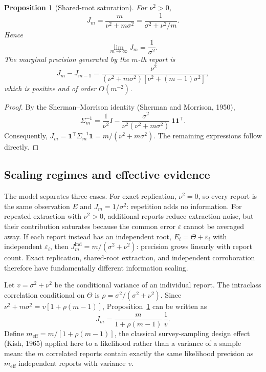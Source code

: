 \documentclass[11pt]{article}
\newtheorem{proposition}{Proposition}
\theoremstyle{definition}
\begin{document}
\begin{proposition}[Shared-root saturation]
\label{prop:saturation}
For $\nu^2>0$,
\[
J_m
=
\frac{m}{\nu^2+m\sigma^2}
=
\frac{1}{\sigma^2+\nu^2/m}.
\]
Hence
\[
\lim_{m\rightarrow\infty}J_m
=
\frac{1}{\sigma^2}.
\]
The marginal precision generated by the $m$-th report is
\[
J_m-J_{m-1}
=
\frac{\nu^2}
{(\nu^2+m\sigma^2)[\nu^2+(m-1)\sigma^2]},
\]
which is positive and of order $O(m^{-2})$.
\end{proposition}

\begin{proof}
By the Sherman--Morrison identity (Sherman and Morrison, 1950),
\[
\Sigma_m^{-1}
=
\frac{1}{\nu^2}I
-
\frac{\sigma^2}
{\nu^2(\nu^2+m\sigma^2)}
\,\mathbf 1\mathbf 1^\top.
\]
Consequently, $J_m=\mathbf 1^\top\Sigma_m^{-1}\mathbf 1=m/(\nu^2+m\sigma^2)$. The remaining expressions follow directly.
\end{proof}

\subsection{Scaling regimes and effective evidence}
\label{sec:scaling-regimes}

The model separates three cases. For exact replication, $\nu^2=0$, so every report is the same observation $E$ and $J_m=1/\sigma^2$: repetition adds no information. For repeated extraction with $\nu^2>0$, additional reports reduce extraction noise, but their contribution saturates because the common error $\varepsilon$ cannot be averaged away. If each report instead has an independent root, $E_i=\Theta+\varepsilon_i$ with independent $\varepsilon_i$, then $J_m^{\mathrm{ind}}=m/(\sigma^2+\nu^2)$: precision grows linearly with report count. Exact replication, shared-root extraction, and independent corroboration therefore have fundamentally different information scaling.

Let $v=\sigma^2+\nu^2$ be the conditional variance of an individual report. The intraclass correlation conditional on $\Theta$ is $\rho=\sigma^2/(\sigma^2+\nu^2)$. Since $\nu^2+m\sigma^2=v[1+\rho(m-1)]$, Proposition~\ref{prop:saturation} can be written as
\[
J_m
=
\frac{m}{1+\rho(m-1)}
\,\frac{1}{v}.
\]
Define $m_{\mathrm{eff}}=m/[1+\rho(m-1)]$, the classical survey-sampling design effect (Kish, 1965) applied here to a likelihood rather than a variance of a sample mean: the $m$ correlated reports contain exactly the same likelihood precision as $m_{\mathrm{eff}}$ independent reports with variance $v$.
\end{document}
